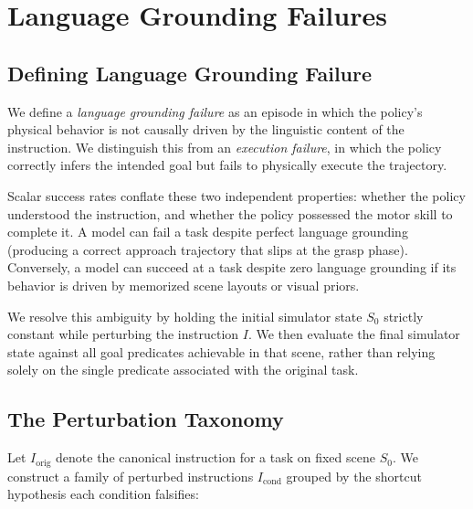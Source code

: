 \documentclass[11pt]{article}
\begin{document}
\section{Language Grounding Failures}
\label{sec:language-grounding-failures}

\subsection{Defining Language Grounding Failure}
\label{subsec:defining-failure}

We define a \emph{language grounding failure} as an episode in which the policy's physical behavior is not causally driven by the linguistic content of the instruction. We distinguish this from an \emph{execution failure}, in which the policy correctly infers the intended goal but fails to physically execute the trajectory. 

Scalar success rates conflate these two independent properties: whether the policy understood the instruction, and whether the policy possessed the motor skill to complete it. A model can fail a task despite perfect language grounding (producing a correct approach trajectory that slips at the grasp phase). Conversely, a model can succeed at a task despite zero language grounding if its behavior is driven by memorized scene layouts or visual priors.

We resolve this ambiguity by holding the initial simulator state $S_0$ strictly constant while perturbing the instruction $I$. We then evaluate the final simulator state against all goal predicates achievable in that scene, rather than relying solely on the single predicate associated with the original task.

\subsection{The Perturbation Taxonomy}
\label{subsec:taxonomy}

Let $I_{\text{orig}}$ denote the canonical instruction for a task on fixed scene $S_0$. We construct a family of perturbed instructions $I_{\text{cond}}$ grouped by the shortcut hypothesis each condition falsifies:
\end{document}
